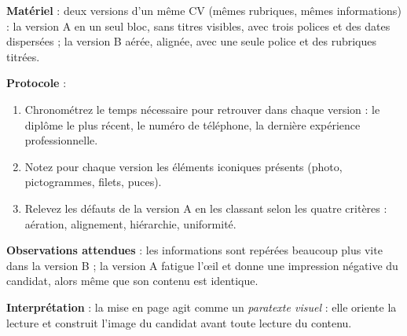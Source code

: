 \documentclass[11pt]{article}
\begin{document}
\begin{experience}
\textbf{Matériel} : deux versions d'un même CV (mêmes rubriques, mêmes informations) : la version A en un seul bloc, sans titres visibles, avec trois polices et des dates dispersées ; la version B aérée, alignée, avec une seule police et des rubriques titrées.

\textbf{Protocole} :
\begin{enumerate}
\item Chronométrez le temps nécessaire pour retrouver dans chaque version : le diplôme le plus récent, le numéro de téléphone, la dernière expérience professionnelle.
\item Notez pour chaque version les éléments iconiques présents (photo, pictogrammes, filets, puces).
\item Relevez les défauts de la version A en les classant selon les quatre critères : aération, alignement, hiérarchie, uniformité.
\end{enumerate}

\textbf{Observations attendues} : les informations sont repérées beaucoup plus vite dans la version B ; la version A fatigue l'œil et donne une impression négative du candidat, alors même que son contenu est identique.

\textbf{Interprétation} : la mise en page agit comme un \emph{paratexte visuel} : elle oriente la lecture et construit l'image du candidat avant toute lecture du contenu.
\end{experience}
\end{document}
